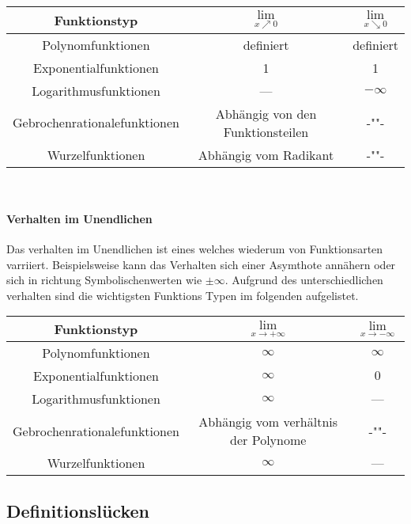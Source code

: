 \documentclass{article}
\begin{document}
		\begin{tabular}{|c|c|c|}
			\hline 
			Funktionstyp & $\lim\limits_{x \nearrow 0}$& $\lim\limits_{x \searrow 0}$ \\
			\hline
			Polynomfunktionen & definiert & definiert \\
			\hline
			Exponentialfunktionen & 1 & 1 \\
			\hline
			Logarithmusfunktionen & --- & $- \infty$ \\
			\hline
			Gebrochenrationalefunktionen & Abhängig von den Funktionsteilen  & -""-\\
			\hline
			Wurzelfunktionen & Abhängig vom Radikant & -""- \\ 
			\hline
		\end{tabular}\\
		
		\paragraph{Verhalten im Unendlichen \\}\label{Verhalten Im unendlichen} 
			
			Das verhalten im Unendlichen ist eines welches wiederum von Funktionsarten varriiert. Beispielsweise kann das Verhalten sich einer Asymthote annähern oder sich in richtung Symbolischenwerten wie $ \pm \infty$. Aufgrund des unterschiedlichen verhalten sind die wichtigsten Funktions Typen im folgenden aufgelistet.
		
			\begin{tabular}{|c|c|c|}
				\hline 
				Funktionstyp & $\lim\limits_{x \rightarrow + \infty}$& $\lim\limits_{x \rightarrow - \infty}$ \\
				\hline
				Polynomfunktionen & $\infty$ & $\infty$ \\
				\hline
				Exponentialfunktionen & $\infty$ & $0$ \\
				\hline
				Logarithmusfunktionen & $\infty$ & --- \\
				\hline
				Gebrochenrationalefunktionen & Abhängig vom verhältnis der Polynome & -""- \\
				\hline
				Wurzelfunktionen & $\infty$ & --- \\ 
				\hline
			\end{tabular}
			
	\subsection{Definitionslücken}\label{Definitionslücke}
	
\end{document}
